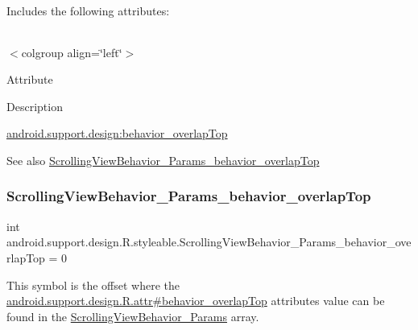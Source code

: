 Includes the following attributes\+:

\tabulinesep=1mm
\begin{longtabu} spread 0pt [c]{*{0}{|X[-1]}|}
\hline
\end{longtabu}
$<$colgroup align=\char`\"{}left\char`\"{}$>$ 

Attribute

Description 

{\ttfamily \hyperlink{classandroid_1_1support_1_1design_1_1R_1_1styleable_a804332f610252049c725629df0cedcd9}{android.\+support.\+design\+:behavior\+\_\+overlap\+Top}}

\begin{DoxySeeAlso}{See also}
\hyperlink{classandroid_1_1support_1_1design_1_1R_1_1styleable_a804332f610252049c725629df0cedcd9}{Scrolling\+View\+Behavior\+\_\+\+Params\+\_\+behavior\+\_\+overlap\+Top} 
\end{DoxySeeAlso}
\mbox{\label{classandroid_1_1support_1_1design_1_1R_1_1styleable_a804332f610252049c725629df0cedcd9}} 
\subsubsection{\texorpdfstring{Scrolling\+View\+Behavior\+\_\+\+Params\+\_\+behavior\+\_\+overlap\+Top}{ScrollingViewBehavior\_Params\_behavior\_overlapTop}}
{\footnotesize\ttfamily int android.\+support.\+design.\+R.\+styleable.\+Scrolling\+View\+Behavior\+\_\+\+Params\+\_\+behavior\+\_\+overlap\+Top = 0\hspace{0.3cm}{\ttfamily [static]}}

This symbol is the offset where the \hyperlink{classandroid_1_1support_1_1design_1_1R_1_1attr_a8c200503a438286a0bccc4c94c42a7d1}{android.\+support.\+design.\+R.\+attr\#behavior\+\_\+overlap\+Top} attribute\textquotesingle{}s value can be found in the \hyperlink{classandroid_1_1support_1_1design_1_1R_1_1styleable_a89ee309ee8c19c6a7c6343663ef077b9}{Scrolling\+View\+Behavior\+\_\+\+Params} array.

